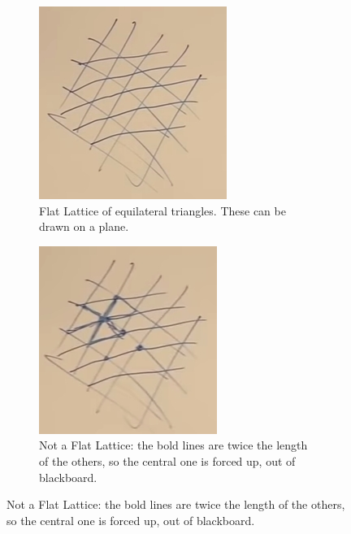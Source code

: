\documentclass[]{article}
\begin{document}
\begin{figure}[H]
	\caption{Can we flatten the lattice onto a surface?}
	\begin{subfigure}[t]{0.5\textwidth}
		\caption{Flat Lattice of equilateral triangles. These can be drawn on a plane.}\label{fig:gr-2-lattice}
		\includegraphics[width=\textwidth]{gr-2-lattice}
	\end{subfigure}
	\begin{subfigure}[t]{0.5\textwidth}
		\caption{Not a Flat Lattice: the bold lines are twice the length of the others, so the central one is forced up, out of blackboard.}\label{fig:gr-2-lattice-not-flat}
		\includegraphics[width=\textwidth]{gr-2-lattice-not-flat}
	\end{subfigure}
\end{figure}
\end{document}
